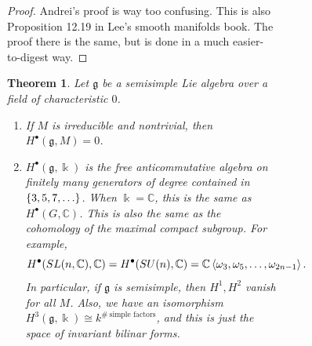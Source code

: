 \documentclass[leqno, openany]{memoir}
\newtheorem{thm}{Theorem}[section]
\theoremstyle{definition}
\theoremstyle{remark}
\theoremstyle{plain}
\theoremstyle{definition}
\theoremstyle{remark}
\newcommand{\C}{\mathbb{C}}
\renewcommand{\k}{\Bbbk}
\newcommand{\mf}[1]{\mathfrak{#1}}
\begin{document}
\begin{figure}[H]
\begin{figure}[H]
\begin{proof} Andrei's proof is way too confusing. This is also Proposition
12.19 in Lee's smooth manifolds book. The proof there is the same, but is done
in a much easier-to-digest way.  \end{proof}

\begin{thm} Let $\mf{g}$ be a semisimple Lie algebra over a field of
    characteristic $0$.  \begin{enumerate} \item If $M$ is irreducible and
        nontrivial, then $H^{\bullet}(\mf{g}, M) = 0$.  \item
        $H^{\bullet}(\mf{g}, \k)$ is the free anticommutative algebra on
        finitely many generators of degree contained in $\qty{3, 5, 7,
        \ldots}$. When $\k = \C$, this is the same as $H^{\bullet}(G, \C)$.
        This is also the same as the cohomology of the maximal compact
        subgroup. For example, \[ H^{\bullet}(SL(n, \C), \C) =
        H^{\bullet}(SU(n), \C) = \C\ev{\omega_3, \omega_5, \ldots,
    \omega_{2n-1}}. \] In particular, if $\mf{g}$ is semisimple, then $H^{1},
    H^2$ vanish for all $M$. Also, we have an isomorphism $H^3(\mf{g}, \k)
    \cong k^{\#\ \text{simple factors}}$, and this is just the space of
    invariant bilinar forms.  \end{enumerate} \end{thm}


\end{figure}
\end{figure}
\end{document}

